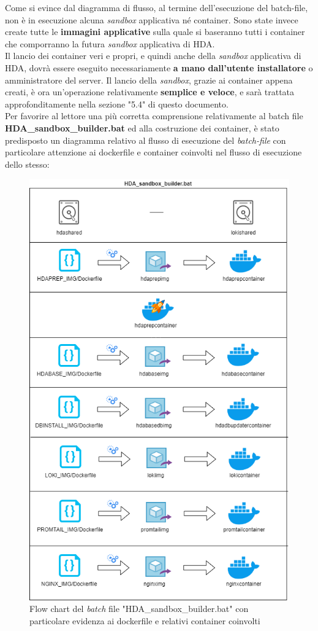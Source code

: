 \newpage
Come si evince dal diagramma di flusso, al termine dell'esecuzione del batch-file, non è in esecuzione alcuna \textit{sandbox} applicativa né container. Sono state invece create tutte le \textbf{immagini applicative} sulla quale si baseranno tutti i container che comporranno la futura \textit{sandbox} applicativa di HDA.\\
Il lancio dei container veri e propri, e quindi anche della \textit{sandbox} applicativa di HDA, dovrà essere eseguito necessariamente \textbf{a mano dall'utente installatore} o amministratore del server.
Il lancio della \textit{sandbox}, grazie ai container appena creati, è ora un'operazione relativamente \textbf{semplice e veloce}, e sarà trattata approfonditamente nella sezione "5.4" di questo documento.\\
Per favorire al lettore una più corretta comprensione relativamente al batch file \textbf{HDA\_sandbox\_builder.bat} ed alla costruzione dei container, è stato predisposto un diagramma relativo al flusso di esecuzione del \textit{batch-file} con particolare attenzione ai dockerfile e container coinvolti nel flusso di esecuzione dello stesso:
\begin{figure}[!h]     
\centering 
    \includegraphics[width=0.6 \columnwidth]{immagini/flowchart/flow_chart_HDA_sandbox_builder} 
    \caption{Flow chart del \textit{batch} file "HDA\_sandbox\_builder.bat" con particolare evidenza ai dockerfile e relativi container coinvolti}
\end{figure}\\
\newpage
